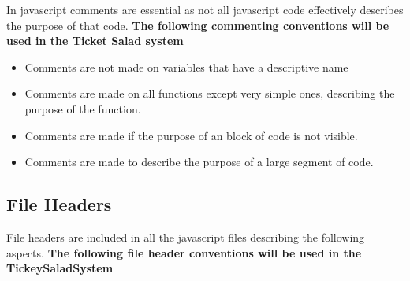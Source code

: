 \documentclass[11pt]{article}
\begin{document}
	In javascript comments are essential as not all javascript code effectively describes the purpose of that code.
	\textbf{The following commenting conventions will be used in the Ticket Salad system}
	\begin{itemize}
		\item Comments are not made on variables that have a descriptive name
		\item Comments are made on all functions except very simple ones, describing the purpose of the function.
		\item Comments are made if the purpose of an block of code is not visible.
		\item Comments are made to describe the purpose of a large segment of code.
	\end{itemize}
	\subsection{File Headers}
	File headers are included in all the javascript files describing the following aspects.
	\newline
	\textbf{The following file header conventions will be used in the TickeySaladSystem}
\end{document}
